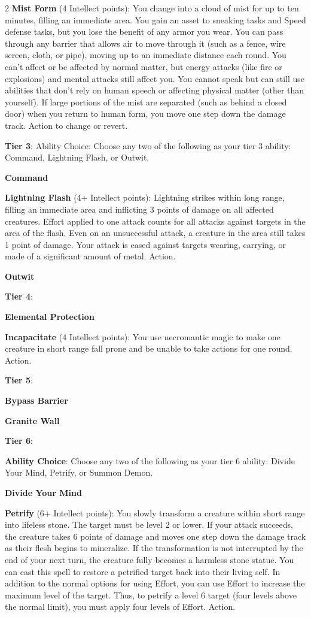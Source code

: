 \begin{multicols}{2}
\textbf{Mist Form} (4 Intellect points): You change into a cloud of mist for up to ten minutes, filling an immediate area. You gain an asset to sneaking tasks and Speed defense tasks, but you lose the benefit of any armor you wear. You can pass through any barrier that allows air to move through it (such as a fence, wire screen, cloth, or pipe), moving up to an immediate distance each round. You can’t affect or be affected by normal matter, but energy attacks (like fire or explosions) and mental attacks still affect you. You cannot speak but can still use abilities that don’t rely on human speech or affecting physical matter (other than yourself). If large portions of the mist are separated (such as behind a closed door) when you return to human form, you move one step down the damage track. Action to change or revert.

\textbf{Tier 3}:
Ability Choice: Choose any two of the following as your tier 3 ability: Command, Lightning Flash, or Outwit.

\textbf{Command}

\textbf{Lightning Flash} (4+ Intellect points): Lightning strikes within long range, filling an immediate area and inflicting 3 points of damage on all affected creatures. Effort applied to one attack counts for all attacks against targets in the area of the flash. Even on an unsuccessful attack, a creature in the area still takes 1 point of damage. Your attack is eased against targets wearing, carrying, or made of a significant amount of metal. Action.

\textbf{Outwit}

\textbf{Tier 4}:

\textbf{Elemental Protection}

\textbf{Incapacitate} (4 Intellect points): You use necromantic magic to make one creature in short range fall prone and be unable to take actions for one round. Action.

\textbf{Tier 5}:

\textbf{Bypass Barrier}
 
\textbf{Granite Wall}

\textbf{Tier 6}:

\textbf{Ability Choice}: Choose any two of the following as your tier 6 ability: Divide Your Mind, Petrify, or Summon Demon.

\textbf{Divide Your Mind}

\textbf{Petrify} (6+ Intellect points): You slowly transform a creature within short range into lifeless stone. The target must be level 2 or lower. If your attack succeeds, the creature takes 6 points of damage and moves one step down the damage track as their flesh begins to mineralize. If the transformation is not interrupted by the end of your next turn, the creature fully becomes a harmless stone statue. You can cast this spell to restore a petrified target back into their living self. In addition to the normal options for using Effort, you can use Effort to increase the maximum level of the target. Thus, to petrify a level 6 target (four levels above the normal limit), you must apply four levels of Effort. Action.


\end{multicols}
